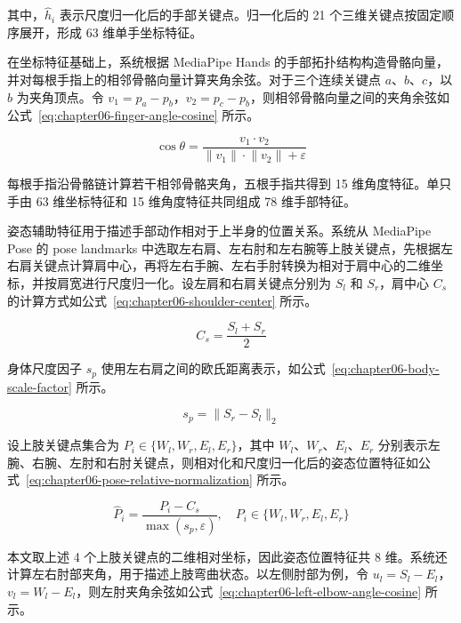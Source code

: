 其中，$\hat{h}_i$ 表示尺度归一化后的手部关键点。归一化后的 21 个三维关键点按固定顺序展开，形成 63 维单手坐标特征。

在坐标特征基础上，系统根据 MediaPipe Hands 的手部拓扑结构构造骨骼向量，并对每根手指上的相邻骨骼向量计算夹角余弦。对于三个连续关键点 $a$、$b$、$c$，以 $b$ 为夹角顶点。令 $v_1=p_a-p_b$，$v_2=p_c-p_b$，则相邻骨骼向量之间的夹角余弦如公式~\ref{eq:chapter06-finger-angle-cosine} 所示。

\begin{equation}
\cos\theta = \frac{v_1 \cdot v_2}{\lVert v_1\rVert \cdot \lVert v_2\rVert + \varepsilon}
\label{eq:chapter06-finger-angle-cosine}
\end{equation}

每根手指沿骨骼链计算若干相邻骨骼夹角，五根手指共得到 15 维角度特征。单只手由 63 维坐标特征和 15 维角度特征共同组成 78 维手部特征。

姿态辅助特征用于描述手部动作相对于上半身的位置关系。系统从 MediaPipe Pose 的 pose landmarks 中选取左右肩、左右肘和左右腕等上肢关键点，先根据左右肩关键点计算肩中心，再将左右手腕、左右手肘转换为相对于肩中心的二维坐标，并按肩宽进行尺度归一化。设左肩和右肩关键点分别为 $S_l$ 和 $S_r$，肩中心 $C_s$ 的计算方式如公式~\ref{eq:chapter06-shoulder-center} 所示。

\begin{equation}
C_s = \frac{S_l + S_r}{2}
\label{eq:chapter06-shoulder-center}
\end{equation}

身体尺度因子 $s_p$ 使用左右肩之间的欧氏距离表示，如公式~\ref{eq:chapter06-body-scale-factor} 所示。

\begin{equation}
s_p = \lVert S_r - S_l \rVert_2
\label{eq:chapter06-body-scale-factor}
\end{equation}

设上肢关键点集合为 $P_i\in\{W_l,W_r,E_l,E_r\}$，其中 $W_l$、$W_r$、$E_l$、$E_r$ 分别表示左腕、右腕、左肘和右肘关键点，则相对化和尺度归一化后的姿态位置特征如公式~\ref{eq:chapter06-pose-relative-normalization} 所示。

\begin{equation}
\hat{P}_i = \frac{P_i - C_s}{\max(s_p,\varepsilon)},\quad P_i\in\{W_l,W_r,E_l,E_r\}
\label{eq:chapter06-pose-relative-normalization}
\end{equation}

本文取上述 4 个上肢关键点的二维相对坐标，因此姿态位置特征共 8 维。系统还计算左右肘部夹角，用于描述上肢弯曲状态。以左侧肘部为例，令 $u_l=S_l-E_l$，$v_l=W_l-E_l$，则左肘夹角余弦如公式~\ref{eq:chapter06-left-elbow-angle-cosine} 所示。

